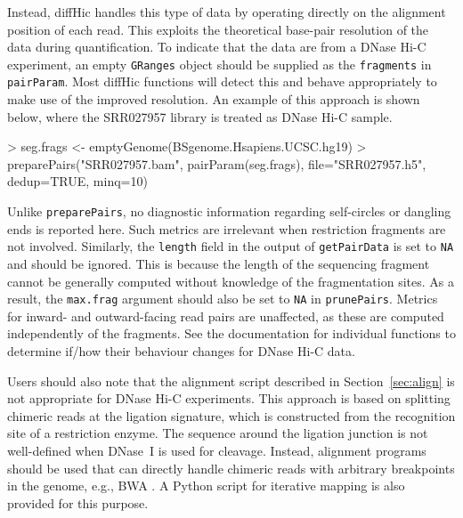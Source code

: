 \documentclass[12pt]{report}
\renewenvironment{Schunk}{\vspace{0pt}}{\vspace{0pt}}
\newcommand{\pkgname}{diffHic}
\newcommand{\code}[1]{{\small\texttt{#1}}}
\begin{document}
Instead, \pkgname{} handles this type of data by operating directly on the alignment position of each read.
This exploits the theoretical base-pair resolution of the data during quantification.
To indicate that the data are from a DNase Hi-C experiment, an empty \code{GRanges} object should be supplied as the \code{fragments} in \code{pairParam}.
Most \pkgname{} functions will detect this and behave appropriately to make use of the improved resolution.
An example of this approach is shown below, where the SRR027957 library is treated as DNase Hi-C sample.

\begin{Schunk}
\begin{Sinput}
> seg.frags <- emptyGenome(BSgenome.Hsapiens.UCSC.hg19)
> preparePairs("SRR027957.bam", pairParam(seg.frags), file="SRR027957.h5", dedup=TRUE, minq=10)
\end{Sinput}
\end{Schunk}

Unlike \code{preparePairs}, no diagnostic information regarding self-circles or dangling ends is reported here.
Such metrics are irrelevant when restriction fragments are not involved.
Similarly, the \code{length} field in the output of \code{getPairData} is set to \code{NA} and should be ignored.
This is because the length of the sequencing fragment cannot be generally computed without knowledge of the fragmentation sites.
As a result, the \code{max.frag} argument should also be set to \code{NA} in \code{prunePairs}.
Metrics for inward- and outward-facing read pairs are unaffected, as these are computed independently of the fragments.
See the documentation for individual functions to determine if/how their behaviour changes for DNase Hi-C data.

Users should also note that the alignment script described in Section~\ref{sec:align} is not appropriate for DNase Hi-C experiments.
This approach is based on splitting chimeric reads at the ligation signature, which is constructed from the recognition site of a restriction enzyme.
The sequence around the ligation junction is not well-defined when DNase~I is used for cleavage.
Instead, alignment programs should be used that can directly handle chimeric reads with arbitrary breakpoints in the genome, e.g., BWA \citep{li2010fast}.
A Python script for iterative mapping \citep{imakaev2012iterative} is also provided for this purpose.
\end{document}
